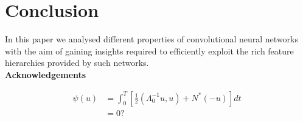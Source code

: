 \documentclass[runningheads]{llncs}
\begin{document}








\section{Conclusion}
\label{sec:conclusion}
In this paper we analysed different properties of convolutional neural networks with the aim of gaining insights required to efficiently exploit the rich feature hierarchies provided by such networks. \\

\noindent \textbf{Acknowledgements}

\begin{align}
  \psi (u) & = \int_{0}^{T} \left[\frac{1}{2}
  \left(\Lambda_{0}^{-1} u,u\right) + N^{\ast} (-u)\right] dt \; \\
& = 0 ?
\end{align}




\end{document}
